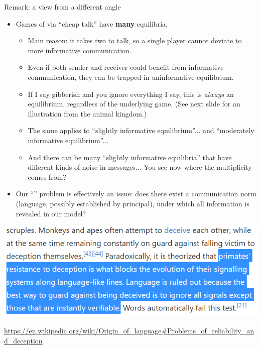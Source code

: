 \documentclass[english,10pt
,aspectratio=169
]{beamer}
\begin{document}
\begin{frame}{Remark: a view from a different angle}
\begin{itemize}
	\item Games of  via ``cheap talk'' have \alert{\textbf{many} equilibria}. 
	\begin{itemize}
		\item Main reason: it takes two to talk, so a single player cannot deviate to more informative communication.
		\item Even if both sender and receiver could benefit from informative communication, they can be trapped in uninformative equilibrium.
		\item If I say gibberish and you ignore everything I say, this is \emph{always} an equilibrium, regardless of the underlying game. (See next slide for an illustration from the animal kingdom.)
		\item The same applies to ``slightly informative equilibrium''... and ``moderately informative equilibrium''...
		\item And there can be many ``slightly informative equilibria'' that have different kinds of noise in messages... You see now where the multiplicity comes from?
	\end{itemize}
	\item Our ``'' problem is effectively an  issue: does there exist a communication norm (language, possibly established by principal), under which all information is revealed in our model?
\end{itemize}
\end{frame}


\begin{frame}
	\includegraphics[scale=1.05]{pics/M4/cheaptalkmonke.png}
	\medskip
	
	\url{https://en.wikipedia.org/wiki/Origin_of_language\#Problems_of_reliability_and_deception}
\end{frame}
\end{document}
